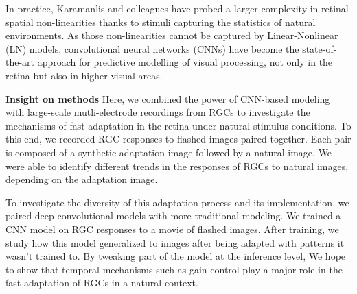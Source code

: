 
In practice, Karamanlis and colleagues \citep{kim_nonlinear_2020} have
probed a larger complexity in retinal spatial non-linearities thanks to stimuli
capturing the statistics of natural environments.
As those non-linearities cannot be captured by Linear-Nonlinear (LN) models,
convolutional neural networks (CNNs) have become the state-of-the-art approach
for predictive modelling of visual processing, not only in the retina but also
in higher visual areas. %

\textbf{Insight on methods}
Here, we combined the power of CNN-based modeling with large-scale
mutli-electrode recordings from RGCs to investigate the mechanisms of fast
adaptation in the retina under natural stimulus conditions. To this end, we
recorded RGC responses to flashed images paired together. Each pair is composed
of a synthetic adaptation image followed by a natural image. We were able to
identify different trends in the responses of RGCs to natural images, depending
on the adaptation image.


To investigate the diversity of this adaptation process and its implementation,
we paired deep convolutional models with more traditional modeling. We trained
a CNN model on RGC responses to a movie of flashed images. After training, we
study how this model generalized to images after being adapted with
patterns it wasn't trained to. By tweaking part of the model at the inference
level, We hope to show that temporal mechanisms such as gain-control play a
major role in the fast adaptation of RGCs in a natural context.